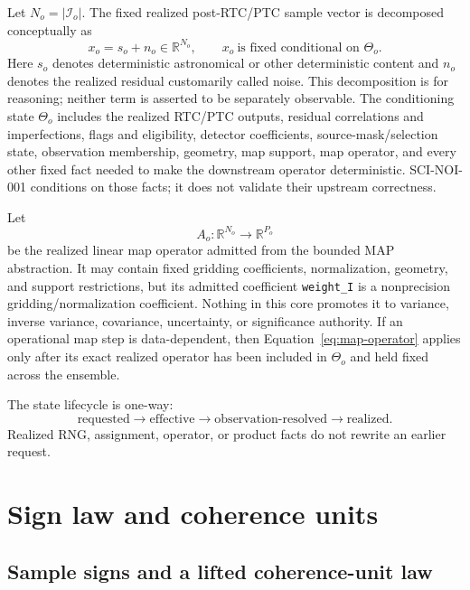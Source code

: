 \documentclass[11pt]{article}
\begin{document}
Let $N_o=|\mathcal I_o|$.  The fixed realized post-RTC/PTC sample vector is
decomposed conceptually as
\begin{equation}
  x_o=s_o+n_o\in\mathbb R^{N_o},
  \qquad
  x_o\ \text{is fixed conditional on }\Theta_o .
  \label{eq:fixed-state}
\end{equation}
Here $s_o$ denotes deterministic astronomical or other deterministic content
and $n_o$ denotes the realized residual customarily called noise.  This
decomposition is for reasoning; neither term is asserted to be separately
observable.  The conditioning state $\Theta_o$ includes the realized RTC/PTC
outputs, residual correlations and imperfections, flags and eligibility,
detector coefficients, source-mask/selection state, observation membership,
geometry, map support, map operator, and every other fixed fact needed to make
the downstream operator deterministic.  SCI-NOI-001 conditions on those
facts; it does not validate their upstream correctness.

Let
\begin{equation}
  A_o:\mathbb R^{N_o}\longrightarrow\mathbb R^{P_o}
  \label{eq:map-operator}
\end{equation}
be the realized linear map operator admitted from the bounded MAP abstraction.
It may contain fixed gridding coefficients, normalization, geometry, and
support restrictions, but its admitted coefficient \texttt{weight\_I} is a
nonprecision gridding/normalization coefficient.  Nothing in this core
promotes it to variance, inverse variance, covariance, uncertainty, or
significance authority.  If an operational map step is data-dependent, then
Equation~\eqref{eq:map-operator} applies only after its exact realized operator
has been included in $\Theta_o$ and held fixed across the ensemble.

The state lifecycle is one-way:
\begin{equation}
  \text{requested}\longrightarrow\text{effective}
  \longrightarrow\text{observation-resolved}
  \longrightarrow\text{realized}.
  \label{eq:state-lifecycle}
\end{equation}
Realized RNG, assignment, operator, or product facts do not rewrite an earlier
request.

\section{Sign law and coherence units}

\subsection{Sample signs and a lifted coherence-unit law}
\end{document}
